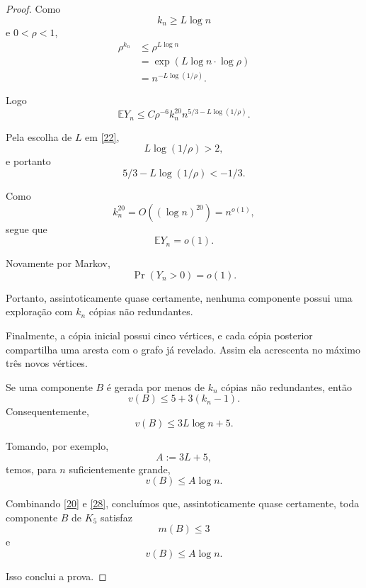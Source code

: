 \documentclass[reqno, 12pt]{amsart}
\numberwithin{equation}{section}
\theoremstyle{plain}
\theoremstyle{definition}
\begin{document}
\begin{proof}
  Como
  \[
    k_n\ge L\log n
  \]
  e $0<\rho<1$,
  \[
    \begin{aligned}
      \rho^{k_n}
       & \le
      \rho^{L\log n} \\
       & =
      \exp\!\left(
      L\log n\cdot\log\rho
      \right)        \\
       & =
      n^{-L\log(1/\rho)}.
    \end{aligned}
    \tag{25}\label{25}
  \]

  Logo
  \[
    \mathbb E Y_n
    \le
    C\rho^{-6}
    k_n^{20}
    n^{5/3-L\log(1/\rho)}.
    \tag{26}\label{26}
  \]

  Pela escolha de $L$ em \eqref{22},
  \[
    L\log(1/\rho)>2,
  \]
  e portanto
  \[
    5/3-L\log(1/\rho)
    <
    -1/3.
  \]

  Como
  \[
    k_n^{20}
    =
    O((\log n)^{20})
    =
    n^{o(1)},
  \]
  segue que
  \[
    \mathbb E Y_n=o(1).
    \tag{27}\label{27}
  \]

  Novamente por Markov,
  \[
    \Pr(Y_n>0)=o(1).
  \]

  Portanto, assintoticamente quase certamente, nenhuma componente possui
  uma exploração com $k_n$ cópias não redundantes.

  Finalmente, a cópia inicial possui cinco vértices, e cada cópia
  posterior compartilha uma aresta com o grafo já revelado. Assim ela
  acrescenta no máximo três novos vértices.

  Se uma componente $B$ é gerada por menos de $k_n$ cópias não
  redundantes, então
  \[
    v(B)
    \le
    5+3(k_n-1).
  \]
  Consequentemente,
  \[
    v(B)
    \le
    3L\log n+5.
    \tag{28}\label{28}
  \]

  Tomando, por exemplo,
  \[
    A:=3L+5,
  \]
  temos, para $n$ suficientemente grande,
  \[
    v(B)\le A\log n.
  \]

  Combinando \eqref{20} e \eqref{28}, concluímos que, assintoticamente
  quase certamente, toda componente $B$ de $K_5$ satisfaz
  \[
    m(B)\le3
  \]
  e
  \[
    v(B)\le A\log n.
  \]

  Isso conclui a prova.
\end{proof}




\printbibliography
\end{document}
